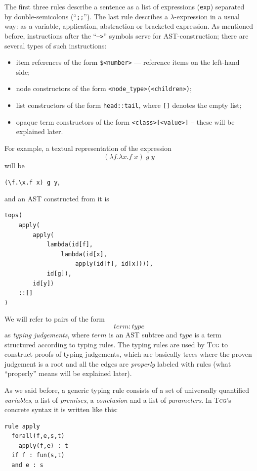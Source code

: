 \documentclass[a4paper,12pt]{article}
\newcommand{\Tcg}{\textsc{Tcg}}
\newcommand{\code}[1]{\texttt{#1}}
\newcounter{premise}
\begin{document}
The first three rules describe a sentence as a list of expressions (\code{exp}) separated by double-semicolons (``\code{;;}''). The last rule describes a $\lambda$-expression in a usual way: as a variable, application, abstraction or bracketed expression. As mentioned before, instructions after the ``\code{-->}'' symbols serve for AST-construction; there are several types of such instructions:
\begin{itemize}
 \item item references of the form \code{\$<number>} --- reference items on the left-hand side;
 \item node constructors of the form \code{<node_type>(<children>)};
 \item list constructors of the form \code{head::tail}, where \code{[]} denotes the empty list;
 \item opaque term constructors of the form \code{<class>[<value>]} -- these will be explained later.
\end{itemize}

For example, a textual representation of the expression 
$$(\lambda f.\lambda x. f\; x)\; g\; y$$
will be 
\begin{center}
\code{(\textbackslash f.\textbackslash x.f x) g y},
\end{center}
and an AST constructed from it is%
\begin{verbatim}
tops(
    apply(
        apply(
            lambda(id[f], 
                lambda(id[x], 
                    apply(id[f], id[x]))),
            id[g]),
        id[y])
    ::[]
)
\end{verbatim}

We will refer to pairs of the form
$$term : type$$
as \emph{typing judgements}, where $term$ is an AST subtree and $type$ is a term structured according to typing rules. The typing rules are used by \Tcg{} to construct proofs of typing judgements, which are basically trees where the proven judgement is a root and all the edges are \emph{properly} labeled with rules (what ``properly'' means will be explained later). 

As we said before, a generic typing rule consists of a set of universally quantified \emph{variables}, a list of \emph{premises}, a \emph{conclusion} and a list of \emph{parameters}. In \Tcg{}'s concrete syntax it is written like this:
\begin{verbatim}
rule apply
  forall(f,e,s,t)
    apply(f,e) : t
  if f : fun(s,t)
  and e : s
\end{verbatim}
\end{document}

